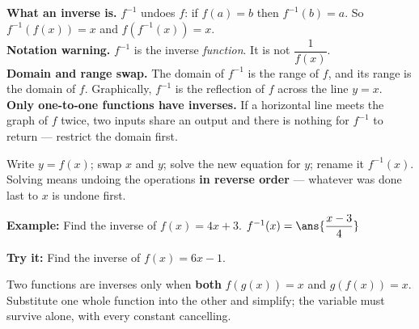 \documentclass[12pt]{article}
\begin{document}

\begin{formulabox}
\textbf{What an inverse is.} $f^{-1}$ undoes $f$: if $f(a) = b$ then
$f^{-1}(b) = a$. So $f^{-1}(f(x)) = x$ and $f(f^{-1}(x)) = x$.\\[3pt]
\textbf{Notation warning.} $f^{-1}$ is the inverse \emph{function}. It is not
$\dfrac{1}{f(x)}$.\\[3pt]
\textbf{Domain and range swap.} The domain of $f^{-1}$ is the range of $f$, and
its range is the domain of $f$. Graphically, $f^{-1}$ is the reflection of $f$
across the line $y = x$.\\[3pt]
\textbf{Only one-to-one functions have inverses.} If a horizontal line meets
the graph of $f$ twice, two inputs share an output and there is nothing for
$f^{-1}$ to return --- restrict the domain first.
\end{formulabox}


\begin{formulabox}
Write $y = f(x)$; swap $x$ and $y$; solve the new equation for $y$; rename it
$f^{-1}(x)$. Solving means undoing the operations \textbf{in reverse order} ---
whatever was done last to $x$ is undone first.
\end{formulabox}

\begin{examplebox}
\textbf{Example:} Find the inverse of $f(x) = 4x + 3$.
$f^{-1}(x) = \ans{\dfrac{x-3}{4}}$
\end{examplebox}

\begin{tryitbox}
\textbf{Try it:} Find the inverse of $f(x) = 6x - 1$.\\[2pt]
\end{tryitbox}


\begin{formulabox}
Two functions are inverses only when \textbf{both} $f(g(x)) = x$ and
$g(f(x)) = x$. Substitute one whole function into the other and simplify; the
variable must survive alone, with every constant cancelling.
\end{formulabox}
\end{document}
